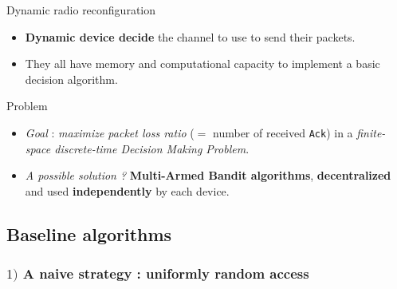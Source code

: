\begin{frameO}[Hypotheses ($2/2$)]

    \begin{colorblock}{Dynamic radio reconfiguration}

        \begin{itemize}
            \item
                \textbf{Dynamic device decide} the channel to use to send their packets.
            \item
                They all have memory and computational capacity to implement a basic decision algorithm.
        \end{itemize}

    \end{colorblock}

    \vspace*{20pt}

    \begin{lightblock}{Problem}

        \begin{itemize}
            \item
                  \emph{Goal} : \emph{maximize packet loss ratio} (\(=\) number of
                  received \texttt{Ack}) in a \emph{finite-space discrete-time Decision
                      Making Problem}.
            \item
                  \emph{A possible solution ?} \textbf{Multi-Armed Bandit algorithms},
                  \textbf{decentralized} and used \textbf{independently} by each device.
        \end{itemize}

    \end{lightblock}

\end{frameO}



\subsection{Baseline algorithms}

\subsubsection{$1)$ A naive strategy : uniformly random access}

